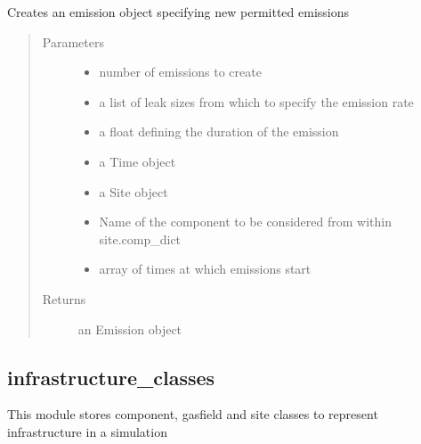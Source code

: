 \documentclass[letterpaper,10pt,english]{sphinxmanual}
\begin{document}
\begin{fulllineitems}
\label{\detokenize{index:feast.EmissionSimModules.emission_class_functions.permitted_emission}}
Creates an emission object specifying new permitted emissions
\begin{quote}\begin{description}
\item[{Parameters}] \leavevmode\begin{itemize}
\item {} 
 \textendash{} number of emissions to create

\item {} 
 \textendash{} a list of leak sizes from which to specify the emission rate

\item {} 
 \textendash{} a float defining the duration of the emission

\item {} 
 \textendash{} a Time object

\item {} 
 \textendash{} a Site object

\item {} 
 \textendash{} Name of the component to be considered from within site.comp\_dict

\item {} 
 \textendash{} array of times at which emissions start

\end{itemize}

\item[{Returns}] \leavevmode
an Emission object

\end{description}\end{quote}

\end{fulllineitems}



\subsection{infrastructure\_classes}
\label{\detokenize{index:module-feast.EmissionSimModules.infrastructure_classes}}\label{\detokenize{index:infrastructure-classes}}
This module stores component, gasfield and site classes to represent infrastructure in a simulation
\end{document}
